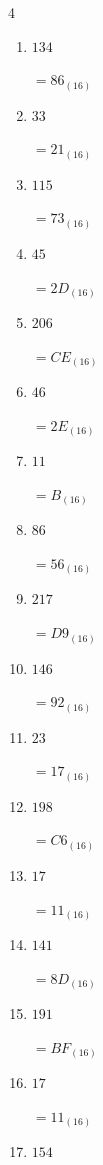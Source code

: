 \begin{multicols}{4}
\begin{enumerate}
  \item $134$

        $=86_{(16)}$

  \item $33$

        $=21_{(16)}$

  \item $115$

        $=73_{(16)}$

  \item $45$

        $=2D_{(16)}$

  \item $206$

        $=CE_{(16)}$

  \item $46$

        $=2E_{(16)}$

  \item $11$

        $=B_{(16)}$

  \item $86$

        $=56_{(16)}$

  \item $217$

        $=D9_{(16)}$

  \item $146$

        $=92_{(16)}$

  \item $23$

        $=17_{(16)}$

  \item $198$

        $=C6_{(16)}$

  \item $17$

        $=11_{(16)}$

  \item $141$

        $=8D_{(16)}$

  \item $191$

        $=BF_{(16)}$

\columnbreak %

  \item $17$

        $=11_{(16)}$

  \item $154$


\end{enumerate}
\end{multicols}
